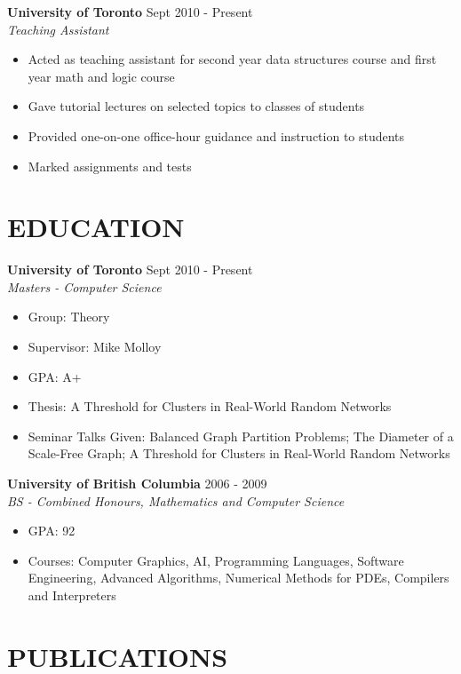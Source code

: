 \documentclass[line,margin]{res}
\begin{document}
\begin{resume}
    {\bf University of Toronto} \hfill Sept 2010 - Present \\
    {\sl Teaching Assistant}
                 \begin{itemize}  \itemsep -2pt %
                 \item Acted as teaching assistant for second year data structures course and first year math and logic course\item Gave tutorial lectures on selected topics to classes of students\item Provided one-on-one office-hour guidance and instruction to students\item Marked assignments and tests
                \end{itemize}
  

\section{EDUCATION}

    {\bf University of Toronto} \hfill Sept 2010 - Present \\
    {\sl Masters - Computer Science}
                 \begin{itemize}  \itemsep -2pt %
                 \item Group: Theory\item Supervisor: Mike Molloy\item GPA: A+ \item Thesis: A Threshold for Clusters in Real-World Random Networks\item Seminar Talks Given: Balanced Graph Partition Problems; The Diameter of a Scale-Free Graph; A Threshold for Clusters in Real-World Random Networks
                \end{itemize}
  
    {\bf University of British Columbia} \hfill 2006 - 2009 \\
    {\sl BS - Combined Honours, Mathematics and Computer Science}
                 \begin{itemize}  \itemsep -2pt %
                 \item GPA: 92\item Courses: Computer Graphics, AI, Programming Languages, Software Engineering, Advanced Algorithms, Numerical Methods for PDEs, Compilers and Interpreters 
                \end{itemize}
  

\section{PUBLICATIONS}


\end{resume}
\end{document}
